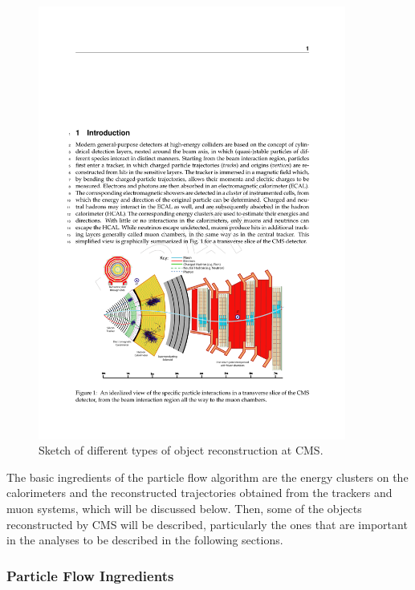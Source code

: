 \begin{figure}[h]
\centering 
\includegraphics[width=0.9\textwidth]{figures/cms_reco}\hfil
\caption{Sketch of different types of object reconstruction at CMS. }
\label{fig:cms_reco}
\end{figure}

The basic ingredients of the particle flow algorithm are the energy clusters on the calorimeters and the reconstructed trajectories obtained from the trackers and muon systems, which will be discussed below.  
Then, some of the objects reconstructed by CMS will be described, particularly the ones that are important in the analyses to be described in the following sections.

\subsubsection{Particle Flow Ingredients}

